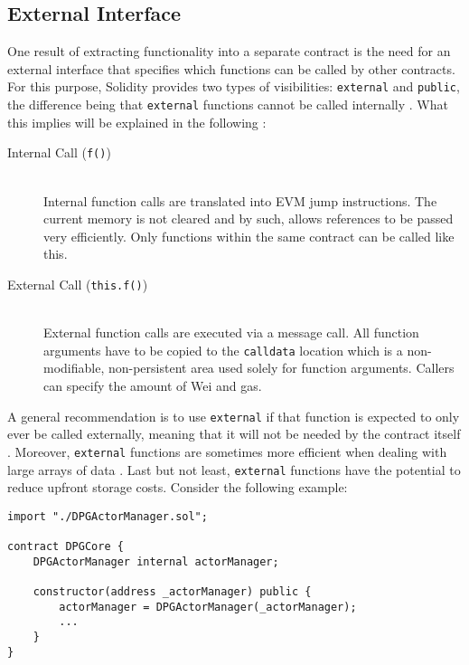 \subsection{External Interface}
\label{sec:externalInterface}
One result of extracting functionality into a separate contract is the need for an external interface that specifies which functions can be called by other contracts. For this purpose, Solidity provides two types of visibilities: \texttt{external} and \texttt{public}, the difference being that \texttt{external} functions cannot be called internally \cite[p.~77]{solidityDocs}. What this implies will be explained in the following \cite[pp.~57, 69]{solidityDocs}:

\begin{description}
	\item[Internal Call (\texttt{f()})]
	\hfill \\
	Internal function calls are translated into \ac{EVM} jump instructions. The current memory is not cleared and by such, allows references to be passed very efficiently. Only functions within the same contract can be called like this.
	\item[External Call (\texttt{this.f()})]
	\hfill \\
	External function calls are executed via a message call. All function arguments have to be copied to the \texttt{calldata} location which is a non-modifiable, non-persistent area used solely for function arguments. Callers can specify the amount of Wei and gas. 
\end{description}

A general recommendation is to use \texttt{external} if that function is expected to only ever be called externally, meaning that it will not be needed by the contract itself \cite{externalPublic}. Moreover, \texttt{external} functions are sometimes more efficient when dealing with large arrays of data \cite[p.~77]{solidityDocs}. Last but not least, \texttt{external} functions have the potential to reduce upfront storage costs. Consider the following example:

\begin{lstlisting}[language=Solidity, caption=Sharing external contract interface via inheritance, label=lst:actorManagerReference]
import "./DPGActorManager.sol";

contract DPGCore {
	DPGActorManager internal actorManager;
	
	constructor(address _actorManager) public {
		actorManager = DPGActorManager(_actorManager);
		...
	}
}
\end{lstlisting}

